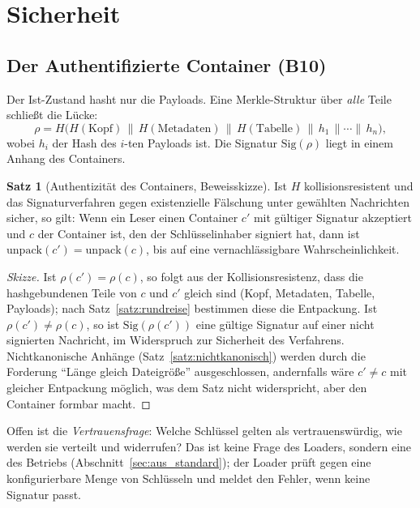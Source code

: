 \documentclass[a4paper,12pt,twoside]{report}
\DeclareRobustCommand{\_}{\ifmmode\mbox{\textunderscore}\else\textunderscore\allowbreak{}\fi}
\theoremstyle{definition}
\newtheorem{satz}{Satz}[chapter]
\newcommand{\Bf}[1]{\textbf{B#1}}
\begin{document}
\section{Sicherheit}
\label{sec:aus_sicher}

\subsection{Der Authentifizierte Container (\Bf{10})}
Der Ist-Zustand hasht nur die Payloads. Eine Merkle-Struktur \cite{merkle1987} über \emph{alle} Teile schließt die Lücke:
\[
\rho=H\big(H(\mathrm{Kopf})\,\|\,H(\mathrm{Metadaten})\,\|\,H(\mathrm{Tabelle})\,\|\,h_1\,\|\cdots\|\,h_n\big),
\]
wobei $h_i$ der Hash des $i$-ten Payloads ist. Die Signatur $\mathrm{Sig}(\rho)$ liegt in einem Anhang des Containers.

\begin{satz}[Authentizität des Containers, Beweisskizze]\label{satz:auth_aus}
	Ist $H$ kollisionsresistent und das Signaturverfahren gegen existenzielle Fälschung unter gewählten Nachrichten sicher, so gilt: Wenn ein Leser einen Container $c'$ mit gültiger Signatur akzeptiert und $c$ der Container ist, den der Schlüsselinhaber signiert hat, dann ist $\mathrm{unpack}(c')=\mathrm{unpack}(c)$, bis auf eine vernachlässigbare Wahrscheinlichkeit.
\end{satz}
\begin{proof}[Skizze]
	Ist $\rho(c')=\rho(c)$, so folgt aus der Kollisionsresistenz, dass die hashgebundenen Teile von $c$ und $c'$ gleich sind (Kopf, Metadaten, Tabelle, Payloads); nach Satz~\ref{satz:rundreise} bestimmen diese die Entpackung. Ist $\rho(c')\ne\rho(c)$, so ist $\mathrm{Sig}(\rho(c'))$ eine gültige Signatur auf einer nicht signierten Nachricht, im Widerspruch zur Sicherheit des Verfahrens. Nichtkanonische Anhänge (Satz~\ref{satz:nichtkanonisch}) werden durch die Forderung ``Länge gleich Dateigröße'' ausgeschlossen, andernfalls wäre $c'\ne c$ mit gleicher Entpackung möglich, was dem Satz nicht widerspricht, aber den Container formbar macht.\qedhere
\end{proof}

Offen ist die \emph{Vertrauensfrage}: Welche Schlüssel gelten als vertrauenswürdig, wie werden sie verteilt und widerrufen? Das ist keine Frage des Loaders, sondern eine des Betriebs (Abschnitt~\ref{sec:aus_standard}); der Loader prüft gegen eine konfigurierbare Menge von Schlüsseln und meldet den Fehler, wenn keine Signatur passt.
\end{document}
